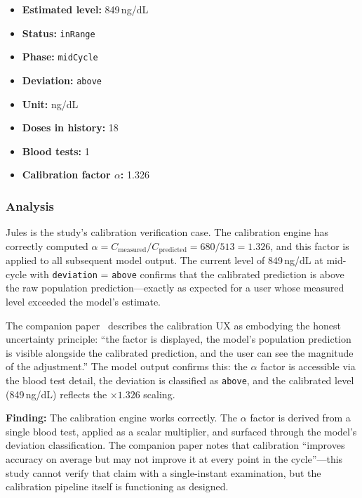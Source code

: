 \documentclass[11pt,a4paper]{article}
\newcommand{\code}[1]{\texttt{\small #1}}
\begin{document}
\begin{itemize}[nosep,leftmargin=1.4em]
\item \textbf{Estimated level:} 849\,ng/dL
\item \textbf{Status:} \code{inRange}
\item \textbf{Phase:} \code{midCycle}
\item \textbf{Deviation:} \code{above}
\item \textbf{Unit:} ng/dL
\item \textbf{Doses in history:} 18
\item \textbf{Blood tests:} 1
\item \textbf{Calibration factor $\alpha$:} 1.326
\end{itemize}

\subsubsection{Analysis}

Jules is the study's calibration verification case. The calibration engine
has correctly computed $\alpha = C_{\text{measured}} / C_{\text{predicted}}
= 680 / 513 = 1.326$, and this factor is applied to all subsequent model
output. The current level of 849\,ng/dL at mid-cycle with
\code{deviation} = \code{above} confirms that the calibrated prediction is
above the raw population prediction---exactly as expected for a user whose
measured level exceeded the model's estimate.

The companion paper~\cite{xtux} describes the calibration UX as embodying
the honest uncertainty principle: ``the factor is displayed, the model's
population prediction is visible alongside the calibrated prediction, and
the user can see the magnitude of the adjustment.'' The model output
confirms this: the $\alpha$ factor is accessible via the blood test detail,
the deviation is classified as \code{above}, and the calibrated level
(849\,ng/dL) reflects the $\times 1.326$ scaling.

\textbf{Finding:} The calibration engine works correctly. The $\alpha$
factor is derived from a single blood test, applied as a scalar multiplier,
and surfaced through the model's deviation classification. The companion
paper notes that calibration ``improves accuracy on average but may not
improve it at every point in the cycle''---this study cannot verify that
claim with a single-instant examination, but the calibration pipeline
itself is functioning as designed.

\end{document}

